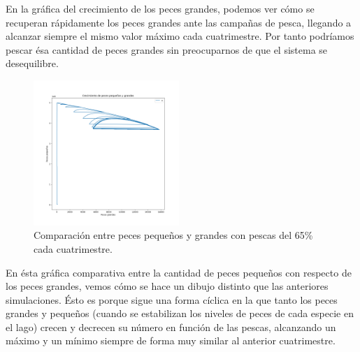 \documentclass[11pt,a4paper]{report}
\begin{document}
En la gráfica del crecimiento de los peces grandes, podemos ver cómo se recuperan rápidamente los peces grandes ante las campañas de pesca, llegando a alcanzar siempre el mismo valor máximo cada cuatrimestre. Por tanto podríamos pescar ésa cantidad de peces grandes sin preocuparnos de que el sistema se desequilibre.

\begin{figure}[H]
	\begin{center}
		\includegraphics[width=0.49\textwidth]{img/Cap-3/apartado-3/pequenyos_grandes_periodo_91.png}
		\caption{Comparación entre peces pequeños y grandes con pescas del 65\% cada cuatrimestre.}
		\label{fig:f3}
	\end{center}
\end{figure}

En ésta gráfica comparativa entre la cantidad de peces pequeños con respecto de los peces grandes, vemos cómo se hace un dibujo distinto que las anteriores simulaciones. Ésto es porque sigue una forma cíclica en la que tanto los peces grandes y pequeños (cuando se estabilizan los niveles de peces de cada especie en el lago) crecen y decrecen su número en función de las pescas, alcanzando un máximo y un mínimo siempre de forma muy similar al anterior cuatrimestre.
\end{document}
